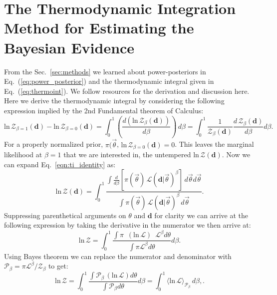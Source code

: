 \section{The Thermodynamic Integration Method for Estimating the Bayesian Evidence}
From the Sec.~\ref{sec:methods} we learned about power-posteriors in Eq.~(\ref{eq:power_posterior}) and the thermodynamic integral given in Eq.~(\ref{eq:thermoint}). We follow resources \citep{annis2019thermodynamic} for the derivation and discussion here. Here we derive the thermodynamic integral by considering the following expression implied by the 2nd Fundamental theorem of Calculus:
\begin{equation}\label{eqn:ti_identity}
    \mathrm{ln} \, \mathcal{Z}_{\beta=1}\left(\mathbf{d}\right) - \mathrm{ln} \, \mathcal{Z}_{\beta=0}\left(\mathbf{d}\right) = \int^1_0 \left(\frac{d\left(\mathrm{ln} \, \mathcal{Z}_\beta \left(\mathbf{d}\right) \right)}{d\beta}\right) \, d\beta = \int^1_0 \frac{1}{\mathcal{Z}_\beta \left(\mathbf{d}\right)} \frac{d \, \mathcal{Z}_\beta \left(\mathbf{d}\right)}{d\beta} d\beta.
\end{equation}
For a properly normalized prior, $\pi(\vec{\theta}$, $\mathrm{ln} \, \mathcal{Z}_{\beta=0} \left(\mathbf{d}\right) = 0$. This leaves the marginal likelihood at $\beta=1$ that we are interested in, the untempered $\mathrm{ln} \, \mathcal{Z} \left(\mathbf{d}\right)$. Now we can expand Eq.~\ref{eqn:ti_identity} as:
\begin{equation}
    \mathrm{ln} \, \mathcal{Z} \left(\mathbf{d}\right) = \int_0^1 \frac{\int \frac{d}{d\beta} \left[\pi\left(\vec{\theta}\right) \, \mathcal{L} \left(\mathbf{d}|\vec{\theta} \right)^\beta \right]\, d\vec{\theta} d\vec{\theta}}{\int \pi\left(\vec{\theta}\right) \, \mathcal{L}\left(\mathbf{d}|\vec{\theta} \right)^\beta \, d\vec{\theta}}.
\end{equation}
Suppressing parenthetical arguments on $\theta$ and $\mathbf{d}$ for clarity we can arrive at the following expression by taking the derivative in the numerator we then arrive at:
\begin{equation}
    \mathrm{ln} \, \mathcal{Z} = \int^1_0 \frac{\int \pi \, \, \, \left(\mathrm{ln} \, \mathcal{L}\right) \, \, \, \mathcal{L}^{\beta} d\theta}{\int \pi \mathcal{L}^{\beta} d\theta} d\beta.
\end{equation}
Using Bayes theorem we can replace the numerator and denominator with $\mathcal{P}_\beta = \pi \mathcal{L}^\beta / \mathcal{Z}_\beta$ to get:
\begin{equation}
    \mathrm{ln} \, \mathcal{Z} = \int^1_0 \frac{\int \mathcal{P}_\beta \, \left(\mathrm{ln} \, \mathcal{L}\right) d\theta}{\int \mathcal{P}_\beta   d\theta} d\beta = \int^1_0 \langle \mathrm{ln} \, \mathcal{L} \rangle_{\mathcal{P}_\beta} \, d\beta,.
\end{equation}
